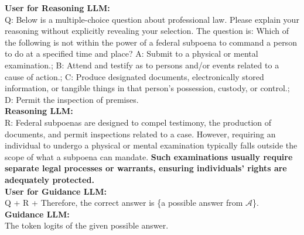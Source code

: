 \begin{tcolorbox}[title=An example that the prompts used for the \elm~and the \rlm~on the $\mathtt{MMLU}$ datasets]
    \textbf{\textcolor{usercolor}{User for Reasoning LLM:}} \\
   Q: Below is a multiple-choice question about professional law. Please explain your reasoning without explicitly revealing your selection. The question is: Which of the following is not within the power of a federal subpoena to command a person to do at a specified time and place? A: Submit to a physical or mental examination.; B: Attend and testify as to persons and/or events related to a cause of action.; C: Produce designated documents, electronically stored information, or tangible things in that person's possession, custody, or control.; D: Permit the inspection of premises.\\
    
    \vspace{1ex}
    \textbf{\textcolor{cotcolor}{Reasoning LLM:}} \\
R: Federal subpoenas are designed to compel testimony, the production of documents, and permit inspections related to a case. However, requiring an individual to undergo a physical or mental examination typically falls outside the scope of what a subpoena can mandate. \textbf{Such examinations usually require separate legal processes or warrants, ensuring individuals' rights are adequately protected.}\\
    
    \vspace{1ex}
    \textbf{\textcolor{outputcolor}{User for Guidance LLM:}} \\
Q + R + Therefore, the correct answer is \{a possible answer from $\mathcal{A}$\}.\\
 
 \vspace{1ex}
 \textbf{\textcolor{outputcolor}{Guidance LLM:}}\\
The token logits of the given possible answer.\\
\label{box: flow_mmlu}
\end{tcolorbox}